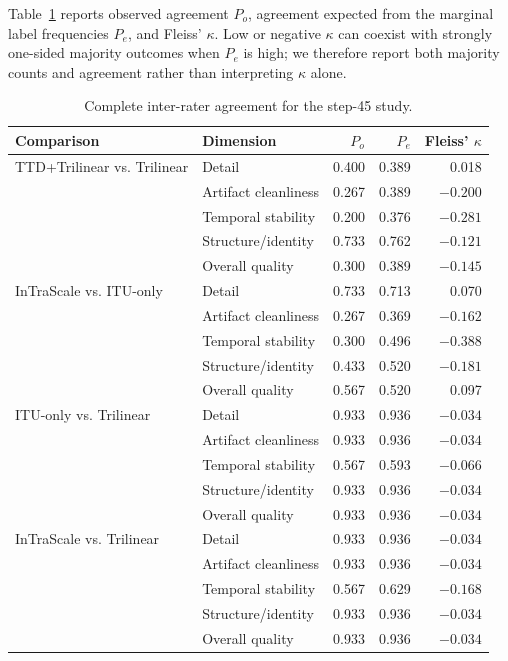 \documentclass[letterpaper]{article}
\begin{document}
Table~\ref{tab:human-agreement} reports observed agreement \(P_o\), agreement
expected from the marginal label frequencies \(P_e\), and Fleiss'
\(\kappa\).  Low or negative \(\kappa\) can coexist with strongly one-sided
majority outcomes when \(P_e\) is high; we therefore report both majority
counts and agreement rather than interpreting \(\kappa\) alone.

\begin{table}[t]
  \centering
  \footnotesize
  \setlength{\tabcolsep}{4pt}
  \renewcommand{\arraystretch}{0.94}
  \begin{tabular}{llrrr}
    \toprule
    Comparison & Dimension & \(P_o\) & \(P_e\) & Fleiss' \(\kappa\) \\
    \midrule
    TTD+Trilinear vs. Trilinear
      & Detail & 0.400 & 0.389 & 0.018 \\
      & Artifact cleanliness & 0.267 & 0.389 & \(-0.200\) \\
      & Temporal stability & 0.200 & 0.376 & \(-0.281\) \\
      & Structure/identity & 0.733 & 0.762 & \(-0.121\) \\
      & Overall quality & 0.300 & 0.389 & \(-0.145\) \\
    \addlinespace
    InTraScale vs. ITU-only
      & Detail & 0.733 & 0.713 & 0.070 \\
      & Artifact cleanliness & 0.267 & 0.369 & \(-0.162\) \\
      & Temporal stability & 0.300 & 0.496 & \(-0.388\) \\
      & Structure/identity & 0.433 & 0.520 & \(-0.181\) \\
      & Overall quality & 0.567 & 0.520 & 0.097 \\
    \addlinespace
    ITU-only vs. Trilinear
      & Detail & 0.933 & 0.936 & \(-0.034\) \\
      & Artifact cleanliness & 0.933 & 0.936 & \(-0.034\) \\
      & Temporal stability & 0.567 & 0.593 & \(-0.066\) \\
      & Structure/identity & 0.933 & 0.936 & \(-0.034\) \\
      & Overall quality & 0.933 & 0.936 & \(-0.034\) \\
    \addlinespace
    InTraScale vs. Trilinear
      & Detail & 0.933 & 0.936 & \(-0.034\) \\
      & Artifact cleanliness & 0.933 & 0.936 & \(-0.034\) \\
      & Temporal stability & 0.567 & 0.629 & \(-0.168\) \\
      & Structure/identity & 0.933 & 0.936 & \(-0.034\) \\
      & Overall quality & 0.933 & 0.936 & \(-0.034\) \\
    \bottomrule
  \end{tabular}
  \caption{Complete inter-rater agreement for the step-45 study.}
  \label{tab:human-agreement}
\end{table}
\end{document}
